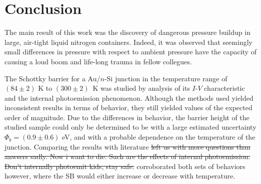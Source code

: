 \section{Conclusion}
The main result of this work was the discovery of dangerous pressure buildup in large, air-tight liquid nitrogen containers.
Indeed, it was observed that seemingly small differences in pressure with respect to ambient pressure have the capacity of causing a loud boom and life-long trauma in fellow collegues.

The Schottky barrier for a Au/$n$-Si junction in the temperature range of $(84 \pm 2)$ K to \mbox{$(300 \pm 2)$ K} was studied by analysis of its $I$-$V$ characteristic and the internal photoemission phenomenon.
Although the methods used yielded inconsistent results in terms of behavior, they still yielded values of the expected order of magnitude.
Due to the differences in behavior, the barrier height of the studied sample could only be determined to be with a large estimated uncertainty $\Phi_b = (0.9 \pm 0.6)$ eV, and with a probable dependence on the temperature of the junction.
Comparing the results with literature \st{left us with more questions than anwsers sadly. Now i want to die. Such are the effects of internal photoemission. Don't internally photoemit kids, stay safe.}
corroborated both sets of behaviors however, where the SB would either increase or decrease with temperature.
